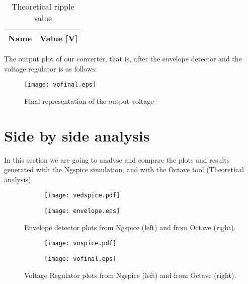 \vspace{0.3in}
\begin{table}[ht]
  \centering
  \begin{tabular}{|l|r|}
    \hline    
    {\bf Name} & {\bf Value [V]} \\ \hline
    
  \end{tabular}
  \caption{Theoretical ripple value}
  \label{tab:2}
\end{table}

The output plot of our converter, that is, after the envelope detector and the voltage regulator is as follows:

\begin{figure}[h] \centering
\texttt{[image: vofinal.eps]}
\caption{Final representation of the output voltage}
\label{fig:vofin}
\end{figure} 


\section{Side by side analysis}

In this section we are going to analyse and compare the plots and results generated with the Ngspice simulation, and with the Octave tool (Theoretical analysis). 


\begin{figure}[H]
\centering
  \begin{subfigure}[b]{0.4\textwidth}
  \centering
    \texttt{[image: vedspice.pdf]}
  \end{subfigure}
  \hfill
  \begin{subfigure}[b]{0.4\textwidth}
  \centering
    \texttt{[image: envelope.eps]}
  \end{subfigure}
  \caption{Envelope detector plots from Ngspice (left) and from Octave (right).}
\end{figure}


\begin{figure}[H]
\centering
  \begin{subfigure}[b]{0.4\textwidth}
  \centering
    \texttt{[image: vospice.pdf]}
  \end{subfigure}
  \hfill
  \begin{subfigure}[b]{0.4\textwidth}
  \centering
    \texttt{[image: vofinal.eps]}
  \end{subfigure}
  \caption{Voltage Regulator plots from Ngspice (left) and from Octave (right).}
\end{figure}


